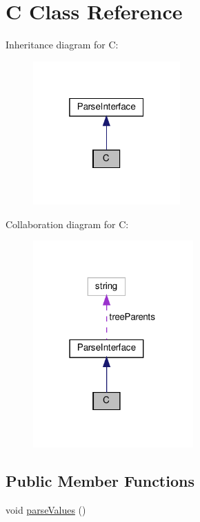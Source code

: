 \hypertarget{classC}{}\section{C Class Reference}
\label{classC}


Inheritance diagram for C\+:
\nopagebreak
\begin{figure}[H]
\begin{center}
\leavevmode
\includegraphics[width=160pt]{classC__inherit__graph}
\end{center}
\end{figure}


Collaboration diagram for C\+:
\nopagebreak
\begin{figure}[H]
\begin{center}
\leavevmode
\includegraphics[width=174pt]{classC__coll__graph}
\end{center}
\end{figure}
\subsection*{Public Member Functions}
\begin{DoxyCompactItemize}
\item 
void \hyperlink{classC_a7f8b8fa8187ab2f50ca999ae9a1687d7}{parse\+Values} ()
\end{DoxyCompactItemize}
